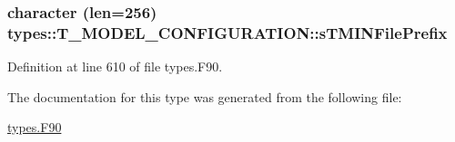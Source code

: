 \hypertarget{typetypes_1_1_t___m_o_d_e_l___c_o_n_f_i_g_u_r_a_t_i_o_n_a6597dd634578c62684ecc4fe1a06538c}{
\subsubsection[{sTMINFilePrefix}]{\setlength{\rightskip}{0pt plus 5cm}character (len=256) {\bf types::T\_\-MODEL\_\-CONFIGURATION::sTMINFilePrefix}}}
\label{typetypes_1_1_t___m_o_d_e_l___c_o_n_f_i_g_u_r_a_t_i_o_n_a6597dd634578c62684ecc4fe1a06538c}


Definition at line 610 of file types.F90.



The documentation for this type was generated from the following file:\begin{DoxyCompactItemize}
\item 
\hyperlink{types_8_f90}{types.F90}\end{DoxyCompactItemize}
